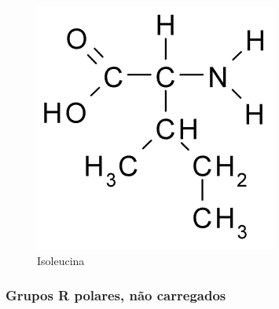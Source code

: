 \documentclass[a4paper,12pt]{article}
\begin{document}
\begin{figure}[H]
\begin{center}
\begin{minipage}{0.3\linewidth}
 				\label{fig:leucine}
 			\end{minipage}
 			\begin{minipage}{0.3\linewidth}
 				\centering   
 				\includegraphics[width=0.8\linewidth]{isoleucine.png}
 				\caption{Isoleucina}
 				\label{fig:isoleucine}
 			\end{minipage}
 		\end{center}
 	\end{figure}
 
 	\subsubsection*{Grupos R polares, não carregados}	
 	
\end{document}
